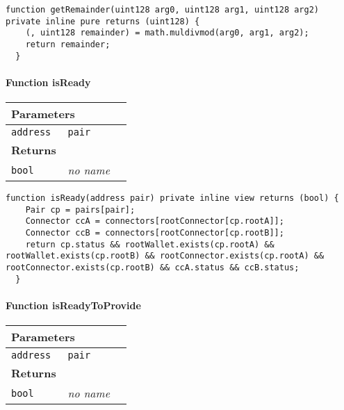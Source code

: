 \vspace{2cm}

\begin{lstlisting}[firstnumber=115]
  function getRemainder(uint128 arg0, uint128 arg1, uint128 arg2) private inline pure returns (uint128) {
    (, uint128 remainder) = math.muldivmod(arg0, arg1, arg2);
    return remainder;
  }
\end{lstlisting}

\paragraph{Function isReady}


\ifsoltables
\noindent\begin{tabular}{|l|l|p{5cm}|}\hline
\multicolumn{3}{|l|}{\bf Parameters}\\\hline
\tt address & \tt pair &\\\hline
\multicolumn{3}{|l|}{\bf Returns}\\\hline
\tt bool & {\em no name} &\\\hline
\end{tabular}
\fi

\vspace{2cm}

\begin{lstlisting}[firstnumber=198]
  function isReady(address pair) private inline view returns (bool) {
    Pair cp = pairs[pair];
    Connector ccA = connectors[rootConnector[cp.rootA]];
    Connector ccB = connectors[rootConnector[cp.rootB]];
    return cp.status && rootWallet.exists(cp.rootA) && rootWallet.exists(cp.rootB) && rootConnector.exists(cp.rootA) && rootConnector.exists(cp.rootB) && ccA.status && ccB.status;
  }
\end{lstlisting}

\paragraph{Function isReadyToProvide}


\ifsoltables
\noindent\begin{tabular}{|l|l|p{5cm}|}\hline
\multicolumn{3}{|l|}{\bf Parameters}\\\hline
\tt address & \tt pair &\\\hline
\multicolumn{3}{|l|}{\bf Returns}\\\hline
\tt bool & {\em no name} &\\\hline
\end{tabular}
\fi

